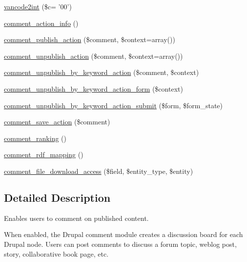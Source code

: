 \begin{DoxyCompactItemize}
\hyperlink{comment_8module_a4882cec0ad94842b2e7f9eb1b7ec27d2}{vancode2int} (\$c= '00')
\item 
\hyperlink{comment_8module_ab37670c10a61b72e8a861c547f1770ab}{comment\_\-action\_\-info} ()
\item 
\hyperlink{group__actions_gab4b880ee11ea9075bf10e6e29d21ba25}{comment\_\-publish\_\-action} (\$comment, \$context=array())
\item 
\hyperlink{group__actions_gaa4f6361d453bff4f865f19bc369ecdfe}{comment\_\-unpublish\_\-action} (\$comment, \$context=array())
\item 
\hyperlink{group__actions_gaf5c19c791a33e0dc2b0bd3eb4fa79ba5}{comment\_\-unpublish\_\-by\_\-keyword\_\-action} (\$comment, \$context)
\item 
\hyperlink{group__forms_gad0012e675df965329fce2570a6be8f46}{comment\_\-unpublish\_\-by\_\-keyword\_\-action\_\-form} (\$context)
\item 
\hyperlink{comment_8module_ad94091cb95aec2dd607bde68a07e0dd1}{comment\_\-unpublish\_\-by\_\-keyword\_\-action\_\-submit} (\$form, \$form\_\-state)
\item 
\hyperlink{group__actions_ga074553675107cf7c8cac925d76666922}{comment\_\-save\_\-action} (\$comment)
\item 
\hyperlink{comment_8module_a7599b61c6ed28e6424dc51f9311539c5}{comment\_\-ranking} ()
\item 
\hyperlink{comment_8module_a7a0a7125c95b61cea16f18f800880cf2}{comment\_\-rdf\_\-mapping} ()
\item 
\hyperlink{comment_8module_a5632b449cf518ee83511f74ac061c644}{comment\_\-file\_\-download\_\-access} (\$field, \$entity\_\-type, \$entity)
\end{DoxyCompactItemize}


\subsection{Detailed Description}
Enables users to comment on published content.

When enabled, the Drupal comment module creates a discussion board for each Drupal node. Users can post comments to discuss a forum topic, weblog post, story, collaborative book page, etc. 

